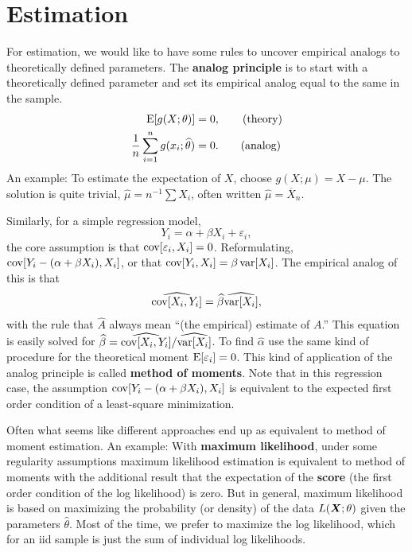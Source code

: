 \documentclass[twoside]{article}
\begin{document}
\section{Estimation}

For estimation, we would like to have some rules to uncover empirical analogs
to theoretically defined parameters. The \textbf{analog principle} is to 
start with a theoretically defined parameter and set its
empirical analog equal to the same in the sample. 
\begin{align}
  \operatorname{E}[g(X;\theta)] &= 0, \tag{theory} \\
  \frac{1}{n}\sum_{i=1}^n g(x_i;\widehat{\theta}) &= 0. \tag{analog} 
\end{align}
An example: To estimate the expectation of $X$, choose $g(X;\mu)=X-\mu$.
The solution is quite trivial, $\widehat{\mu} = n^{-1}\sum X_i$,
often written $\widehat{\mu}=\overline{X}_n$. 

Similarly, for a simple regression model,
\[ Y_i = \alpha + \beta X_i + \varepsilon_i,\] the core assumption is that $\operatorname{cov}[\varepsilon_i,X_i]=0$.
Reformulating, $\operatorname{cov}[Y_i - (\alpha + \beta X_i), X_i]$, or that $\operatorname{cov}[Y_i,X_i] = \beta \operatorname{var}[X_i]$.
The empirical analog of this is that
\[ \widehat{\operatorname{cov}[X_i,Y_i]} = \widehat{\beta} \widehat{\operatorname{var}[X_i]},\]
with the rule that $\widehat{A}$ always mean ``(the empirical) estimate of $A$.'' This equation
is easily solved for $\widehat{\beta} = \widehat{\operatorname{cov}[X_i,Y_i]} / \widehat{\operatorname{var}[X_i]}$. To find
$\widehat{\alpha}$ use the same kind of procedure for the theoretical moment $\operatorname{E}[\varepsilon_i]=0$. This kind
of application of the analog principle is called \textbf{method of moments}. Note
that in this regression case, the assumption $\operatorname{cov}[Y_i - (\alpha + \beta X_i), X_i]$ is equivalent
to the expected first order condition of a least-square minimization.

Often what seems like different approaches end up as equivalent to method of moment estimation.
An example: With \textbf{maximum likelihood}, under some regularity assumptions maximum likelihood 
estimation is equivalent to method of moments with the additional result that the expectation 
of the \textbf{score} (the first order condition of the log likelihood) is zero. But in general,
maximum likelihood is based on maximizing the probability (or density) of the data $L(\bm X;\theta)$ 
given the parameters $\widehat{\theta}$. Most of the time, we prefer to maximize the log likelihood,
which for an iid sample is just the sum of individual log likelihoods.
\end{document}
